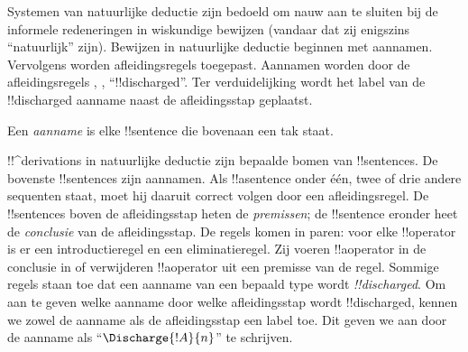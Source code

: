\documentclass[openany]{memoir}
\begin{document}









\endgroup

\begingroup
\def\olfilename{OLP-0085}
\def\olfilepath{content/first-order-logic/natural-deduction/}
\hypertarget{unit-OLP-0085}{}



      {}
      {}


\begin{explain}
Systemen van natuurlijke deductie zijn bedoeld om nauw aan te sluiten
bij de informele redeneringen in wiskundige bewijzen (vandaar dat zij
enigszins ``natuurlijk'' zijn). Bewijzen in natuurlijke deductie
beginnen met aannamen. Vervolgens worden afleidingsregels toegepast.
Aannamen worden door de afleidingsregels \Intro{\lnot}, \Intro{\lif},
``!!{discharged}''. Ter verduidelijking wordt het label van de
!!{discharged} aanname naast de afleidingsstap geplaatst.
\end{explain}

\begin{defn}[Aanname]
Een \emph{aanname} is elke !!{sentence} die bovenaan een tak staat.
\end{defn}

!!^{derivation}s in natuurlijke deductie zijn bepaalde bomen van
!!{sentence}s. De bovenste !!{sentence}s zijn aannamen. Als
!!a{sentence} onder één, twee of drie andere sequenten staat, moet hij
daaruit correct volgen door een afleidingsregel. De !!{sentence}s
boven de afleidingsstap heten de \emph{premissen}; de !!{sentence}
eronder heet de \emph{conclusie} van de afleidingsstap. De regels komen
in paren: voor elke !!{operator} is er een introductieregel en een
eliminatieregel. Zij voeren !!a{operator} in de conclusie in of
verwijderen !!a{operator} uit een premisse van de regel. Sommige regels
staan toe dat een aanname van een bepaald type wordt
\emph{!!{discharged}}. Om aan te geven welke aanname door welke
afleidingsstap wordt !!{discharged}, kennen we zowel de aanname als de
afleidingsstap een label toe. Dit geven we aan door de aanname als
``$\Discharge{!A}{n}$'' te schrijven.
\end{document}
